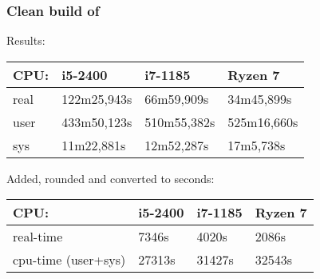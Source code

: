 \documentclass[compress,table,xcolor=table]{beamer}
\begin{document}
\begin{frame}
  \frametitle{Clean build of }
  \Large
  Results:
  \normalsize
  \begin{center}
  {
    \begin{tabular}{|p{3cm}|p{2cm}|p{2cm}|p{2cm}|}
    \hline
      CPU: & i5-2400 & i7-1185 & Ryzen 7 \\
    \hline
      real & 122m25,943s &  66m59,909s &  34m45,899s \\
      user & 433m50,123s & 510m55,382s & 525m16,660s \\
      sys  &  11m22,881s &  12m52,287s &  17m5,738s  \\
    \hline
    \end{tabular}
  }
  \end{center}
  \vfill
  \Large
  Added, rounded and converted to seconds:
  \normalsize
  \begin{center}
  {
    \begin{tabular}{|p{3.5cm}|p{1.5cm}|p{1.5cm}|p{1.5cm}|}
    \hline
      CPU: & i5-2400 & i7-1185 & Ryzen 7 \\
    \hline
      real-time           &  7346s &  4020s &  2086s \\
      cpu-time (user+sys) & 27313s & 31427s & 32543s \\
    \hline
    \end{tabular}
  }
  \end{center}
\end{frame}
\end{document}
